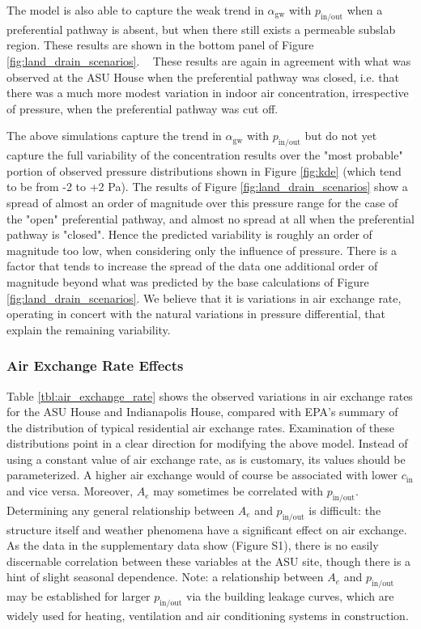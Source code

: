 \documentclass[preprint,12pt]{elsarticle}
\begin{document}
The model is also able to capture the weak trend in $\alpha_\mathrm{gw}$ with $p_\mathrm{in/out}$ when a preferential pathway is absent, but when there still exists a permeable subslab region.
These results are shown in the bottom panel of Figure \ref{fig:land_drain_scenarios}.  
These results are again in agreement with what was observed at the ASU House when the preferential pathway was closed, i.e. that there was a much more modest variation in indoor air concentration, irrespective of pressure, when the preferential pathway was cut off.\par

The above simulations capture the trend in $\alpha_\mathrm{gw}$ with $p_\mathrm{in/out}$ but do not yet capture the full variability of the concentration results over the "most probable" portion of observed pressure distributions shown in Figure \ref{fig:kde} (which tend to be from -2 to +2 Pa).
The results of Figure \ref{fig:land_drain_scenarios} show a spread of almost an order of magnitude over this pressure range for the case of the "open" preferential pathway, and almost no spread at all when the preferential pathway is "closed".
Hence the predicted variability is roughly an order of magnitude too low, when considering only the influence of pressure.
There is a factor that tends to increase the spread of the data one additional order of magnitude beyond what was predicted by the base calculations of Figure \ref{fig:land_drain_scenarios}.
We believe that it is variations in air exchange rate, operating in concert with the natural variations in pressure differential, that explain the remaining variability.\par

\subsubsection{Air Exchange Rate Effects}\label{s:results_modeling_air_exchange}

Table \ref{tbl:air_exchange_rate} shows the observed variations in air exchange rates for the ASU House and Indianapolis House, compared with EPA’s summary of the distribution of typical residential air exchange rates\cite{u.s._epa_exposure_2011,m._d._koontz_estimation_1995}.
Examination of these distributions point in a clear direction for modifying the above model.
Instead of using a constant value of air exchange rate, as is customary, its values should be parameterized.
A higher air exchange would of course be associated with lower $c_\mathrm{in}$ and vice versa.
Moreover, $A_e$ may sometimes be correlated with $p_\mathrm{in/out}$.
Determining any general relationship between $A_e$ and $p_\mathrm{in/out}$ is difficult: the structure itself and weather phenomena have a significant effect on air exchange.
As the data in the supplementary data show (Figure S1), there is no easily discernable correlation between these variables at the ASU site, though there is a hint of slight seasonal dependence.
Note: a relationship between $A_e$ and $p_\mathrm{in/out}$ may be established for larger $p_\mathrm{in/out}$ via the building leakage curves, which are widely used for heating, ventilation and air conditioning systems in construction.\par
\end{document}
